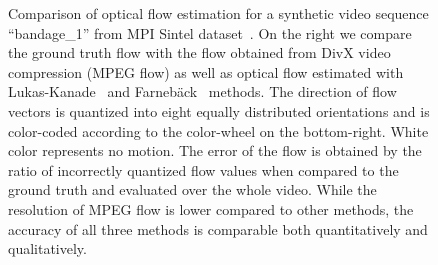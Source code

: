 \begin{figure}[t!]
\begin{center}
\begin{tabular}{p{}p{}p{}}
\end{tabular}
\caption[Comparison of optical flow estimation]{Comparison of optical flow estimation for a synthetic video sequence ``bandage\_1'' from MPI Sintel dataset~\cite{Butler12}. On the right we compare the ground truth flow with the flow obtained from DivX video compression (MPEG flow) as well as optical flow estimated with Lukas-Kanade~\cite{Lucas81} and Farneb\"ack~\cite{Farneback03} methods. The direction of flow vectors is quantized into eight equally distributed orientations and is color-coded according to the color-wheel on the bottom-right. White color represents no motion. The error of the flow is obtained by the ratio of incorrectly quantized flow values when compared to the ground truth and evaluated over the whole video. While the resolution of MPEG flow is lower compared to other methods, the accuracy of all three methods is comparable both quantitatively and qualitatively.
}
\label{fig:flow1}
\end{center}
\end{figure}


